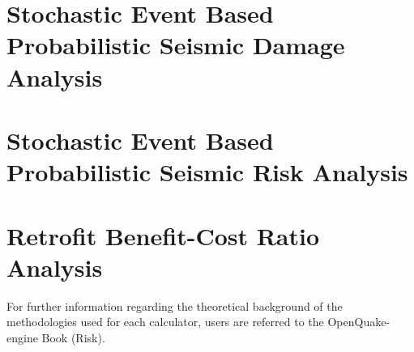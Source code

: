 \section{Stochastic Event Based Probabilistic Seismic Damage Analysis}
\label{sec:workflow_event_based_damage}


\section{Stochastic Event Based Probabilistic Seismic Risk Analysis}
\label{sec:workflow_event_based_risk}


\section{Retrofit Benefit-Cost Ratio Analysis}
\label{sec:workflow_benefit_cost}


For further information regarding the theoretical background of the
methodologies used for each calculator, users are referred to the OpenQuake-
engine Book (Risk).

\cleardoublepage
